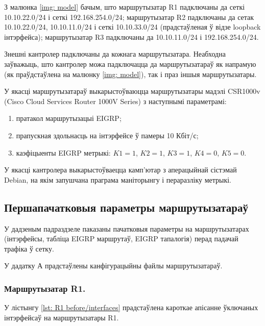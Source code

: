 З малюнка \ref{img: model} бачым, што маршрутызатар R1 падключаны да сеткі 10.10.22.0/24 і сеткі 192.168.254.0/24;
маршрутызатар R2 падключаны да сетак 10.10.22.0/24, 10.10.11.0/24 і сеткі 10.10.33.0/24 (прадстаўленая ў відзе loopback інтэрфейса);
маршрутызатар R3 падключаны да 10.10.11.0/24 і 192.168.254.0/24.

Знешні кантролер падключаны да кожнага маршрутызатара. Неабходна заўважыць, што кантролер можа падключацца да маршрутызатараў
як напрамую (як праўдстаўлена на малюнку \ref{img: model}), так і праз іншыя маршрутызатары.

У якасці маршрутызатараў выкарыстоўваюцца маршрутызатары мадэлі CSR1000v (Cisco Cloud Services Router 1000V Series)
з наступнымі параметрамі:
\begin{enumerate}
    \item пратакол маршрутызацыі EIGRP;
    \item прапускная здольнасць на інтэрфейсе ў памеры 10 Кбіт/с;
    \item каэфіцыенты EIGRP метрыкі: $K1 = 1$, $K2 = 1$, $K3 = 1$, $K4 = 0$, $K5 = 0$.
\end{enumerate}

У якасці кантролера выкарыстоўваецца камп'ютар з аперацыйнай сістэмай Debian, на якім
запушчана праграма маніторынгу і пераразліку метрыкі.

\subsection{Першапачатковыя параметры маршрутызатараў}

У дадзеным падраздзеле паказаны пачатковыя параметры на маршрутызатарах (інтэрфейсы, табліца EIGRP маршрутаў, EIGRP тапалогія)
перад падачай трафіка ў сетку.

У дадатку А прадстаўлены канфігурацыйны файлы маршрутызатараў.

\subsubsection{Маршрутызатар R1.}

У лістынгу \ref{lst: R1 before/interfaces} прадстаўлена кароткае апісанне ўключаных інтэрфейсаў на маршрутызатары R1.



